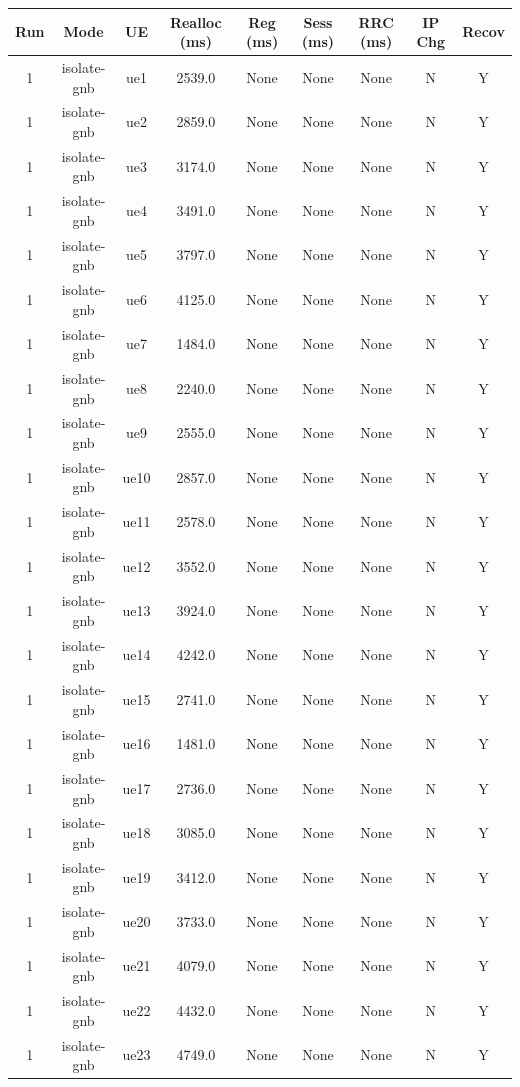 \begin{table}[ht]
\centering
\begin{tabular}{|c|c|c|c|c|c|c|c|c|}
\hline
Run & Mode & UE & Realloc (ms) & Reg (ms) & Sess (ms) & RRC (ms) & IP Chg & Recov \\
\hline
1 & isolate-gnb & ue1 & 2539.0 & None & None & None & N & Y \\
1 & isolate-gnb & ue2 & 2859.0 & None & None & None & N & Y \\
1 & isolate-gnb & ue3 & 3174.0 & None & None & None & N & Y \\
1 & isolate-gnb & ue4 & 3491.0 & None & None & None & N & Y \\
1 & isolate-gnb & ue5 & 3797.0 & None & None & None & N & Y \\
1 & isolate-gnb & ue6 & 4125.0 & None & None & None & N & Y \\
1 & isolate-gnb & ue7 & 1484.0 & None & None & None & N & Y \\
1 & isolate-gnb & ue8 & 2240.0 & None & None & None & N & Y \\
1 & isolate-gnb & ue9 & 2555.0 & None & None & None & N & Y \\
1 & isolate-gnb & ue10 & 2857.0 & None & None & None & N & Y \\
1 & isolate-gnb & ue11 & 2578.0 & None & None & None & N & Y \\
1 & isolate-gnb & ue12 & 3552.0 & None & None & None & N & Y \\
1 & isolate-gnb & ue13 & 3924.0 & None & None & None & N & Y \\
1 & isolate-gnb & ue14 & 4242.0 & None & None & None & N & Y \\
1 & isolate-gnb & ue15 & 2741.0 & None & None & None & N & Y \\
1 & isolate-gnb & ue16 & 1481.0 & None & None & None & N & Y \\
1 & isolate-gnb & ue17 & 2736.0 & None & None & None & N & Y \\
1 & isolate-gnb & ue18 & 3085.0 & None & None & None & N & Y \\
1 & isolate-gnb & ue19 & 3412.0 & None & None & None & N & Y \\
1 & isolate-gnb & ue20 & 3733.0 & None & None & None & N & Y \\
1 & isolate-gnb & ue21 & 4079.0 & None & None & None & N & Y \\
1 & isolate-gnb & ue22 & 4432.0 & None & None & None & N & Y \\
1 & isolate-gnb & ue23 & 4749.0 & None & None & None & N & Y \\

\end{tabular}
\end{table}
